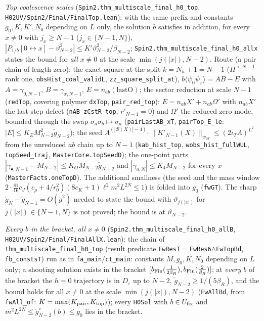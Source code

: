 \documentclass[11pt]{amsart}
\theoremstyle{definition}
\theoremstyle{remark}
\numberwithin{equation}{section}
\newcommand{\conn}{\leftrightarrow}
\begin{document}
\emph{Top coalescence scales} (\texttt{Spin2.thm\_multiscale\_final\_h0\_top}, \texttt{H02UV/Spin2/Final/FinalTop.lean}): with the same prefix
and constants $g_0,K,K',N_0$ depending on $L$ only, the solution $b$ satisfies in addition, for every $x\ne0$ with $j_x\ge N-1$
($j_x\in\{N-1,N\}$),
$|P_{1/b}[0\conn x]-\vartheta_{N-2}^2|\le K'\vartheta_{N-2}^2/\beta_{N-2}$; \texttt{Spin2.thm\_multiscale\_final\_h0\_allx} states the
bound for \emph{all} $x\ne0$ at the scale $\min(j(|x|),N-2)$. Route (a pair chain of length zero): the exact square at the split
$k=N_h+1=N-1$ ($\Pi^{<N-1}$ rank one, \texttt{obsHist\_coal\_validL}, \texttt{zz\_square\_split\_at}), $b\langle\bar\psi_0\psi_x\rangle=AB-E$ with
$A=\gamma_{0,N-1}$, $B=\gamma_{x,N-1}$, $E=n_{ab}(\mathrm{lastO})$; the sector reduction at scale $N-1$ (\texttt{redTop}, covering
polymer \texttt{dxTop}, \texttt{pair\_red\_top}): $E=n_{ab}X'+n_{ab}\Omega'$ with $n_{ab}X'$ the last-step defect
(\texttt{nAB\_zCstR\_top}, $r'_{N-1}=0$) and $\Omega'$ the reduced zero mode, bounded through the swap $\sigma_a\sigma_b\mapsto\sigma_a$
(\texttt{pairLastAB\_xT}, \texttt{pairTop\_E\_le}: $|E|\le K_EM_{N-2}^2\check g_{N-2}$); the seed
$A^{(|\mathcal B(X)|-4)_+}\|K'_{N-1}(X)\|_{w_M}\le(2\iota_TA)^{L^2}$ from the unreduced $ab$ chain up to $N-1$
(\texttt{kab\_hist\_top}, \texttt{wobs\_hist\_fullWUL}, \texttt{topSeed\_traj}, \texttt{MasterCore.topSeedD}); the one-point parts
$|\gamma_{\bullet,N-1}-M_{N-2}|\le K_OM_{N-2}\check g_{N-2}$ and $|\gamma_{a,N}|\le K_4M_{N-2}$ for every $x$ (\texttt{MasterFacts.oneTopD}).
The additional smallness (the seed and the mass window $2\cdot\frac{81}{16}c_J(c_\rho+4/r_0^2)(8c_K+1)\ell^2m^2L^{2N}\le1$) is folded into
$g_0$ (\texttt{fwGT}). The sharp $\check g_N-\check g_{N-1}=O(\check g^2)$ needed to state the bound with $\vartheta_{j(|x|)}$ for
$j(|x|)\in\{N-1,N\}$ is not proved; the bound is at $\vartheta_{N-2}$.

\emph{Every $b$ in the bracket, all $x\ne0$} (\texttt{Spin2.thm\_multiscale\_final\_h0\_allB}, \texttt{H02UV/Spin2/Final/FinalAllX.lean}):
the chain of \texttt{thm\_multiscale\_final\_h0\_top} (result predicate \texttt{FwResT}$=$\texttt{FwRes6}$\wedge$\texttt{FwTopBd},
\texttt{fb\_constsT}) run as in \texttt{fa\_main}/\texttt{ct\_main}: constants $M,g_0,K,N_0$ depending on $L$ only; a shooting
solution exists in the bracket $[b_{\rm Fin}(\frac1{2\beta_R}),b_{\rm Fin}(\frac2{\beta_R})]$; at \emph{every} $b$ of the bracket the $h=0$
trajectory is in $D_\varepsilon$ up to $N-2$, $\check g_{N-2}\ge1/(5\beta_R)$, and the bound holds for all $x\ne0$ at the scale
$\min(j(|x|),N-2)$ (\texttt{FwAllBd}, from \texttt{fwAll\_of}: $K=\max(K_{\rm pair},K_{\rm top})$); every \texttt{H0Sol} with
$b\in U_{\rm fix}$ and $m^2L^{2N}\le\check g^c_{N-2}(b)\le g_0$ lies in the bracket.
\end{document}
